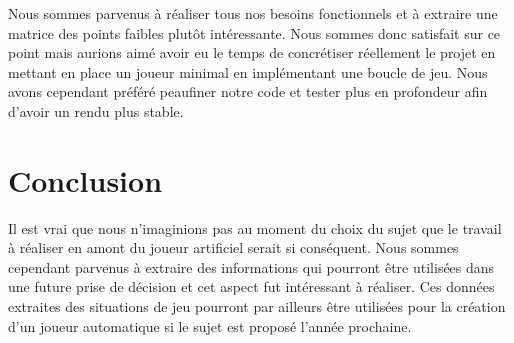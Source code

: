 		Nous sommes parvenus à réaliser tous nos besoins fonctionnels et à extraire une matrice des points faibles plutôt intéressante. 
		Nous sommes donc satisfait sur ce point mais aurions aimé avoir eu le temps de concrétiser réellement le projet en mettant en place un joueur minimal
		en implémentant une boucle de jeu. Nous avons cependant préféré peaufiner notre code et tester plus en profondeur afin d'avoir un rendu plus stable.
		
	\clearpage

	\section{Conclusion}
	
		Il est vrai que nous n'imaginions pas au moment du choix du sujet que le travail à réaliser en amont du joueur artificiel serait si conséquent.
		Nous sommes cependant parvenus à extraire des informations qui pourront être utilisées dans une future prise de décision et cet aspect fut
		intéressant à réaliser. Ces données extraites des situations de jeu pourront par ailleurs être utilisées pour la création d'un joueur automatique 
		si le sujet est proposé l'année prochaine.
		
	\clearpage
